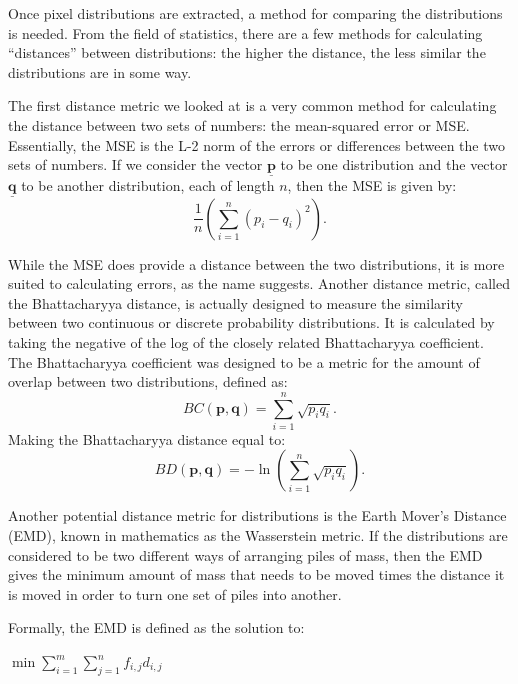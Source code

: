 Once pixel distributions are extracted, a method for comparing the distributions is needed.
From the field of statistics, there are a few methods for calculating ``distances'' between distributions: the higher the distance, the less similar the distributions are in some way.

The first distance metric we looked at is a very common method for calculating the distance between two sets of numbers: the mean-squared error or MSE.
Essentially, the MSE is the L-2 norm of the errors or differences between the two sets of numbers.
If we consider the vector $\underline{\mathbf{p}}$ to be one distribution and the vector $\underline{\mathbf{q}}$ to be another distribution, each of length $n$, then the MSE is given by:
\begin{equation}
\frac{1}{n} \left( \sum_{i=1}^n{(p_i-q_i)^2} \right) .
\end{equation}

While the MSE does provide a distance between the two distributions, it is more suited to calculating errors, as the name suggests.
Another distance metric, called the Bhattacharyya distance, is actually designed to measure the similarity between two continuous or discrete probability distributions.
It is calculated by taking the negative of the log of the closely related Bhattacharyya coefficient.
The Bhattacharyya coefficient was designed to be a metric for the amount of overlap between two distributions, defined as:
\begin{equation}
BC(\mathbf{p}, \mathbf{q}) = \sum_{i=1}^n{\sqrt{p_iq_i}} .
\end{equation}
Making the Bhattacharyya distance equal to:
\begin{equation}
BD(\mathbf{p}, \mathbf{q}) = - \ln \left( \sum_{i=1}^n {\sqrt{p_iq_i}} \right) .
\end{equation}

Another potential distance metric for distributions is the Earth Mover's Distance (EMD), known in mathematics as the Wasserstein metric.
If the distributions are considered to be two different ways of arranging piles of mass, then the EMD gives the minimum amount of mass that needs to be moved times the distance it is moved in order to turn one set of piles into another.

Formally, the EMD is defined as the solution to:
\begin{center}
$\min{\sum\limits_{i=1}^{m}{\sum\limits_{j=1}^{n}{f_{i, j}d_{i, j}}}}$
\end{center}

